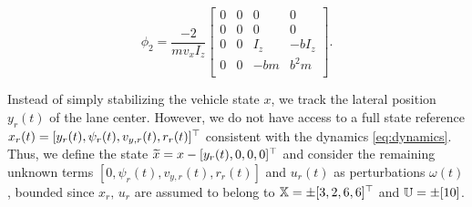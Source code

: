 \documentclass[letterpaper, 10 pt, conference]{ieeeconf}  %
\begin{document}
\[
\phi_2 = \frac{-2}{m v_x I_z}\begin{bmatrix}
0 & 0 & 0 & 0 \\
0 & 0 & 0 & 0 \\
0 & 0 & I_z & -b I_z \\
0 & 0 & - bm & b^2 m \\
\end{bmatrix}.
\]

Instead of simply stabilizing the vehicle state $x$, we track the lateral position $y_r(t)$ of the lane center. However, we do not have access to a full state reference $x_r(t) = [y_r(t), \psi_r(t), v_{y,r}(t), r_r(t)]^\top$ consistent with the dynamics \eqref{eq:dynamics}. Thus, we define the state $\widetilde{x} = x - [y_r(t), 0, 0, 0]^\top$ and consider the remaining unknown terms $[0, \psi_r(t), v_{y,r}(t), r_r(t)]$ and $u_r(t)$ as perturbations $\omega(t)$, bounded since $x_r,\,u_r$ are assumed to belong to $\mathbb{X} = \pm[3, 2, 6, 6]^\top$ and $\mathbb{U}=\pm[10]$.
\end{document}
